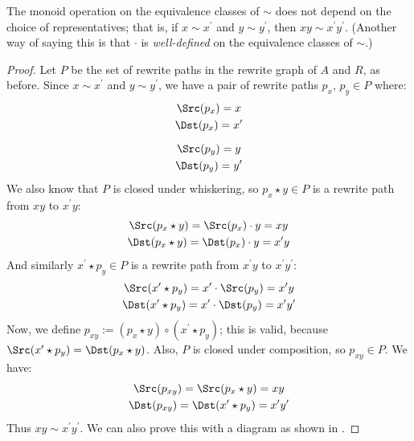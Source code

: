 \documentclass[../generics]{subfiles}
\begin{document}
\begin{proposition}
%
The monoid operation on the equivalence classes of $\sim$ does not depend on the choice of representatives; that is, if $x\sim x^\prime$ and $y\sim y^\prime$, then $xy\sim x^\prime y^\prime$. (Another way of saying this is that $\cdot$ is \emph{well-defined} on the equivalence classes of $\sim$.)
\end{proposition}
\begin{proof}
Let $P$ be the set of rewrite paths in the rewrite graph of $A$ and $R$, as before. Since $x\sim x^\prime$ and $y\sim y^\prime$, we have a pair of rewrite paths $p_x,\,p_y\in P$ where:
\begin{gather*}
\Src(p_x)=x\\
\Dst(p_x)=x^\prime\\[\medskipamount]
\Src(p_y)=y\\
\Dst(p_y)=y^\prime
\end{gather*}
We also know that $P$ is closed under whiskering, so $p_x\star y\in P$ is a rewrite path from $xy$ to $x^\prime y$:
\begin{gather*}
\Src(p_x\star y)=\Src(p_x)\cdot y=xy\\
\Dst(p_x\star y)=\Dst(p_x)\cdot y=x^\prime y
\end{gather*}
And similarly $x^\prime\star p_y\in P$ is a rewrite path from $x^\prime y$ to $x^\prime y^\prime$:
\begin{gather*}
\Src(x^\prime \star p_y)=x^\prime \cdot\Src(p_y)=x^\prime y\\
\Dst(x^\prime \star p_y)=x^\prime \cdot\Dst(p_y)=x^\prime y^\prime
\end{gather*}
Now, we define $p_{xy}:=(p_x\star y) \circ (x^\prime\star p_y)$; this is valid, because $\Src(x^\prime \star p_y)=\Dst(p_x\star y)$.
Also, $P$ is closed under composition, so $p_{xy}\in P$. We have:
\begin{gather*}
\Src(p_{xy}) = \Src(p_x\star y) = xy\\
\Dst(p_{xy}) = \Dst(x^\prime \star p_y) = x^\prime y^\prime
\end{gather*}
Thus $xy\sim x^\prime y^\prime$. We can also prove this with a diagram as shown in .
\end{proof}
\end{document}

